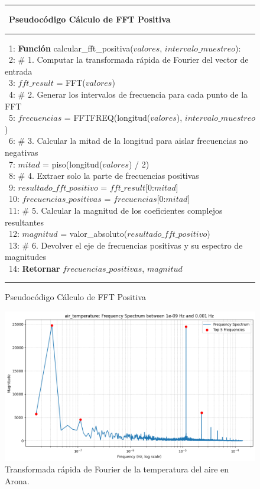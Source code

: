  \begin{figure}[H]
{\small
 \hrule \
 {\bf\small Pseudocódigo Cálculo de FFT Positiva}
 \hrule
\begin{center}
\begin{tabbing}
\ 1: {\bf Fun}\={\bf ción} calcular\_fft\_positiva($valores$, $intervalo\_muestreo$): \\
\ 2: \> \# 1. Computar la transformada rápida de Fourier del vector de entrada \\
\ 3: \> $fft\_result$ = FFT($valores$)  \\
\ 4: \> \# 2. Generar los intervalos de frecuencia para cada punto de la FFT \\
\ 5: \> $frecuencias$ = FFTFREQ(longitud($valores$), $intervalo\_muestreo$)  \\
\ 6: \> \# 3. Calcular la mitad de la longitud para aislar frecuencias no negativas \\
\ 7: \> $mitad$ = piso(longitud($valores$) / 2)  \\
\ 8: \> \# 4. Extraer solo la parte de frecuencias positivas \\
\ 9: \> $resultado\_fft\_positivo$ = $fft\_result$[0:$mitad$]  \\
\ 10: \> $frecuencias\_positivas$ = $frecuencias$[0:$mitad$]  \\
\ 11: \> \# 5. Calcular la magnitud de los coeficientes complejos resultantes \\
\ 12: \> $magnitud$ = valor\_absoluto($resultado\_fft\_positivo$)  \\
\ 13: \> \# 6. Devolver el eje de frecuencias positivas y su espectro de magnitudes \\
\ 14: \> {\bf Retornar} $frecuencias\_positivas$, $magnitud$  \\
\end{tabbing}
\end{center}
\hrule
}
\caption{Pseudocódigo Cálculo de FFT Positiva}
\label{fft_positive}
\end{figure}


\begin{figure}
    \centering
    \includegraphics[width=.5\linewidth]{images/fft_temperature.png}
    \caption{Transformada rápida de Fourier de la temperatura del aire en Arona.}
    \label{fft_temperature}
\end{figure}

